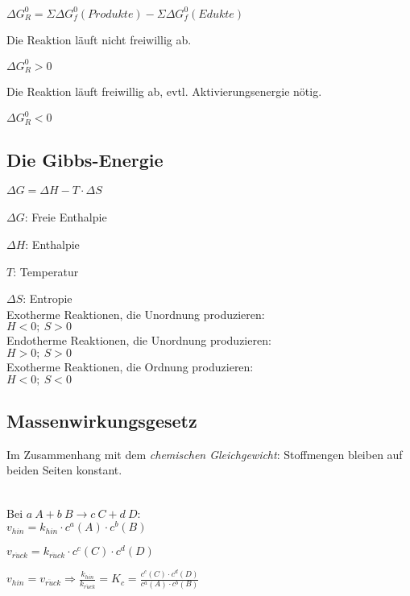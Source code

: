 {\large
	$\Delta G^0_R = \Sigma \Delta G^0_f (Produkte) - \Sigma \Delta G^0_f (Edukte)$
}
	
\begin{definition}
	Die Reaktion läuft nicht freiwillig ab.
	
	$\Delta G^0_R > 0$
\end{definition}

\begin{definition}
	Die Reaktion läuft freiwillig ab, evtl. Aktivierungsenergie nötig.
	
	$\Delta G^0_R < 0$
\end{definition}

\subsection{Die Gibbs-Energie}

{\large
	$\Delta G = \Delta H - T\cdot \Delta S$
}
\\ \\
$\Delta G$: Freie Enthalpie

$\Delta H$: Enthalpie

$T$: Temperatur

$\Delta S$: Entropie \\

Exotherme Reaktionen, die Unordnung produzieren: \\ $H<0; \ S>0$
\\

Endotherme Reaktionen, die Unordnung produzieren: \\ $H>0;\ S>0$
\\

Exotherme Reaktionen, die Ordnung produzieren: \\ $H<0;\ S<0$

\subsection{Massenwirkungsgesetz}

Im Zusammenhang mit dem \textit{chemischen Gleichgewicht}: Stoffmengen bleiben auf beiden Seiten konstant. \\ \\
{\large
	Bei $a \ A + b\ B \rightarrow c\ C + d\ D$: \\
	
	$v_{hin} = k_{hin} \cdot c^a(A) \cdot c^b(B)$
	
	$v_{r\ddot{u}ck} = k_{r\ddot{u}ck} \cdot c^c(C) \cdot c^d(D)$
	
	$v_{hin}=v_{r\ddot{u}ck} \Rightarrow \frac{k_{hin}}{k_{r\ddot{u}ck}}=K_c=\frac{c^c(C) \cdot c^d(D)}{c^a(A) \cdot c^b(B)}$
}

